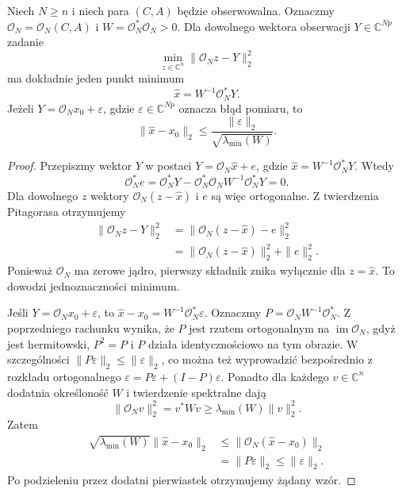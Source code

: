 \begin{stwierdzenie}
\label{prop:lin27-noise}
Niech \(N\ge n\)
i niech para \((C,A)\)
będzie obserwowalna.
Oznaczmy
\(\mathcal O_N=\mathcal O_N(C,A)\)
i \(W=\mathcal O_N^*\mathcal O_N>0\).
Dla dowolnego wektora
obserwacji \(Y\in\mathbb C^{Np}\)
zadanie
\[
 \min_{z\in\mathbb C^n}
      \|\mathcal O_Nz-Y\|_2^2
\]
ma dokładnie jeden punkt minimum
\[
 \widehat x=W^{-1}\mathcal O_N^*Y.
\]
Jeżeli
\(Y=\mathcal O_Nx_0+\varepsilon\),
gdzie
\(\varepsilon\in\mathbb C^{Np}\)
oznacza błąd pomiaru,
to
\[
 \|\widehat x-x_0\|_2
 \le
 \frac{\|\varepsilon\|_2}
      {\sqrt{\lambda_{\min}(W)}}.
\]
\end{stwierdzenie}
\begin{proof}
Przepiszmy wektor \(Y\)
w postaci
\(Y=\mathcal O_N\widehat x+e\),
gdzie
\(\widehat x=W^{-1}\mathcal O_N^*Y\).
Wtedy
\[
 \mathcal O_N^*e
 =\mathcal O_N^*Y
  -\mathcal O_N^*\mathcal O_N
        W^{-1}\mathcal O_N^*Y
 =0.
\]
Dla dowolnego \(z\)
wektory
\(\mathcal O_N(z-\widehat x)\)
i \(e\) są więc ortogonalne.
Z twierdzenia Pitagorasa
otrzymujemy
\[
 \begin{aligned}
 \|\mathcal O_Nz-Y\|_2^2
 &=\|\mathcal O_N(z-\widehat x)-e\|_2^2\\
 &=\|\mathcal O_N(z-\widehat x)\|_2^2
       +\|e\|_2^2.
 \end{aligned}
\]
Ponieważ \(\mathcal O_N\)
ma zerowe jądro,
pierwszy składnik znika
wyłącznie dla
\(z=\widehat x\).
To dowodzi jednoznaczności
minimum.

Jeśli
\(Y=\mathcal O_Nx_0+\varepsilon\),
to
\(\widehat x-x_0
 =W^{-1}\mathcal O_N^*\varepsilon\).
Oznaczmy
\(P=\mathcal O_NW^{-1}\mathcal O_N^*\).
Z poprzedniego rachunku
wynika, że \(P\)
jest rzutem ortogonalnym
na \(\operatorname{im}\mathcal O_N\),
gdyż jest hermitowski,
\(P^2=P\)
i \(P\) działa
identycznościowo
na tym obrazie.
W szczególności
\(\|P\varepsilon\|_2
 \le\|\varepsilon\|_2\),
co można też wyprowadzić
bezpośrednio z
rozkładu ortogonalnego
\(\varepsilon=P\varepsilon
 +(I-P)\varepsilon\).
Ponadto dla każdego
\(v\in\mathbb C^n\)
dodatnia określoność \(W\)
i twierdzenie spektralne dają
\[
 \|\mathcal O_Nv\|_2^2
 =v^*Wv
 \ge\lambda_{\min}(W)\|v\|_2^2.
\]
Zatem
\[
 \begin{aligned}
 \sqrt{\lambda_{\min}(W)}
 \|\widehat x-x_0\|_2
 &\le
 \|\mathcal O_N(\widehat x-x_0)\|_2\\
 &=\|P\varepsilon\|_2
 \le\|\varepsilon\|_2.
 \end{aligned}
\]
Po podzieleniu przez
dodatni pierwiastek
otrzymujemy żądany wzór.
\end{proof}


